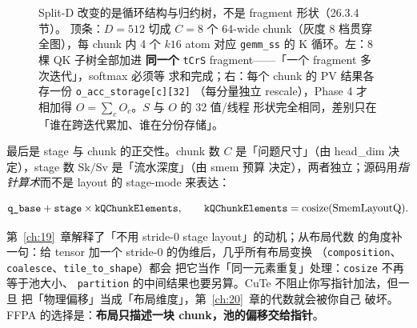 \begin{figure}[H]
\caption{Split-D 改变的是循环结构与归约树，不是 fragment 形状（26.3.4 节）。
顶条：$D=512$ 切成 $C=8$ 个 64-wide chunk（灰度 8 档贯穿全图），每 chunk 内
4 个 $k16$ atom 对应 \texttt{gemm\_ss} 的 K 循环。左：8 棵 QK 子树全部加进
\textbf{同一个} \texttt{tCrS} fragment——「一个 fragment 多次迭代」，softmax 必须等
求和完成；右：每个 chunk 的 PV 结果各存一份 \texttt{o\_acc\_storage[c][32]}
（每分量独立 rescale），Phase 4 才相加得 $O=\sum_c O_c$。$S$ 与 $O$ 的 32 值/线程
形状完全相同，差别只在「谁在跨迭代累加、谁在分份存储」。}
\label{fig:26-splitd-struct}
\end{figure}

最后是 stage 与 chunk 的正交性。chunk 数 $C$ 是「问题尺寸」（由 head\_dim
决定），stage 数 $\mathrm{Sk}/\mathrm{Sv}$ 是「流水深度」（由 smem 预算
决定），两者独立；源码用\emph{指针算术}而不是 layout 的 stage-mode 来表达：

\begin{equation}
  \texttt{q\_base} + \texttt{stage}\times \texttt{k\allowbreak{}QChunk\allowbreak{}Elements},
  \qquad
  \texttt{k\allowbreak{}QChunk\allowbreak{}Elements} = \mathrm{cosize}(\mathrm{SmemLayoutQ}) .
  \label{eq:26-stage}
\end{equation}

第~\ref{ch:19}~章解释了「不用 stride-0 stage layout」的动机；从布局代数
的角度补一句：给 tensor 加一个 stride-0 的伪维后，几乎所有布局变换
（\texttt{composition}、\texttt{coalesce}、\texttt{tile\_\allowbreak{}to\_\allowbreak{}shape}）都会
把它当作「同一元素重复」处理：\texttt{cosize} 不再等于池大小、
\texttt{partition} 的中间结果也要另算。CuTe 不阻止你写指针加法，但一旦
把「物理偏移」当成「布局维度」，第~\ref{ch:20}~章的代数就会被你自己
破坏。FFPA 的选择是：\textbf{布局只描述一块 chunk，池的偏移交给指针}。

